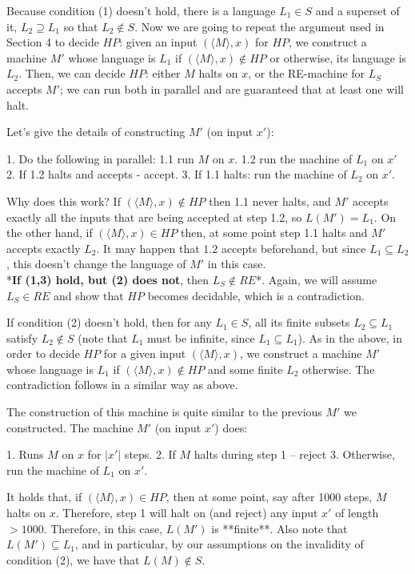 \documentclass[10pt,landscape]{article}
\theoremstyle{plain}%
\theoremstyle{definition}
\theoremstyle{remark}
\begin{document}
\begin{multicols}{3}
Because condition (1)  doesn't hold, there is a language $L_1 \in S$ and a superset of it, $L_2 \supseteq L_1$ so that $L_2 \notin S$. Now we are going to repeat the argument used in Section 4 to decide $HP$: given an input $(\langle M \rangle,x)$ for $HP$, we construct a machine $M'$ whose language is $L_1$ if $(\langle M \rangle,x)\notin HP$ or otherwise, its language is $L_2$. Then, we can decide $HP$: either $M$ halts on $x$, or the RE-machine for $L_S$ accepts $M'$; we can run both in parallel and are guaranteed that at least one will halt.


Let's give the details of constructing $M'$ (on input $x'$):

 1. Do the following in parallel:  
    1.1 run $M$ on $x$.   
    1.2 run the machine of $L_1$ on $x'$
 2. If 1.2 halts and accepts - accept.
 3. If 1.1 halts: run the machine of $L_2$ on $x'$.
 
Why does this work?
If $(\langle M \rangle,x)\notin HP$ then 1.1 never halts, and $M'$ accepts exactly all the inputs that are being accepted at step 1.2, so $L(M')=L_1$. 
On the other hand, if $(\langle M \rangle,x)\in HP$ then, at some point step 1.1 halts and $M'$ accepts exactly $L_2$. It may happen that $1.2$ accepts beforehand, but since $L_1 \subseteq L_2$, this doesn't change the language of $M'$ in this case. 
\\
*\textbf{If (1,3) hold, but (2) does not}, then $L_S \notin RE$*.  
Again, we will assume $L_S\in RE$ and show that $HP$ becomes decidable, which is a contradiction.

If condition (2) doesn't hold, then for any $L_1\in S$, all its finite subsets $L_2 \subseteq L_1$ satisfy $L_2 \notin S$ (note that $L_1$ must be infinite, since $L_1\subseteq L_1$). 
As in the above, in order to decide $HP$ for a given input $(\langle M \rangle,x)$, we construct a machine $M'$ whose language is $L_1$ if $(\langle M \rangle,x)\notin HP$ and some finite $L_2$ otherwise. The contradiction follows in a similar way as above.

The construction of this machine is quite similar to the previous $M'$ we constructed. The machine $M'$ (on input $x'$) does:

 1. Runs $M$ on $x$ for $|x'|$ steps.
 2. If $M$ halts during step 1 – reject
 3. Otherwise, run the machine of $L_1$ on $x'$.

It holds that, if $(\langle M \rangle,x)\in HP$, then at some point, say after 1000 steps, $M$ halts on $x$. Therefore, step 1 will halt on (and reject) any input $x'$ of length $>1000$. Therefore, in this case, $L(M')$ is **finite**. Also note that $L(M') \subseteq L_1$, and in particular, by our assumptions on the invalidity of condition (2), we have that $L(M) \notin S$. 


\end{multicols}
\end{document}
